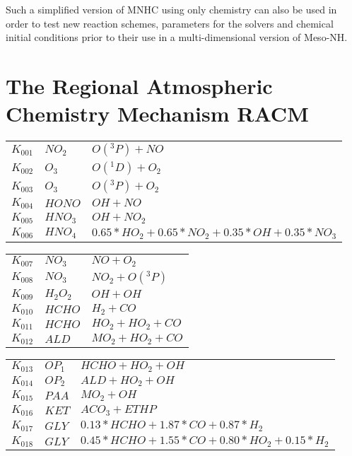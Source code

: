 Such a simplified version of MNHC using only chemistry can also be used
in order to test new reaction schemes, parameters for the solvers and
chemical initial conditions prior to their use in a multi-dimensional
version of Meso-NH.
%
\section*{The Regional Atmospheric Chemistry Mechanism RACM}
\label{RACM}
%
%
{\small
\newlength{\chfwidth}
\setlength{\chfwidth}{1\textwidth}
\noindent
\begin{tabular}{l@{\,:\,}p{0.2\chfwidth}@{$\quad\longrightarrow\quad$}p{0.6\chfwidth}}
$K_{001}$ & $NO_{2}$ & $O({}^3P)+NO$ \\
$K_{002}$ & $O_{3}$ & $O({}^1D)+O_{2}$ \\
$K_{003}$ & $O_{3}$ & $O({}^3P)+O_{2}$ \\
$K_{004}$ & $HONO$ & $OH+NO$ \\
$K_{005}$ & $HNO_{3}$ & $OH+NO_{2}$ \\
$K_{006}$ & $HNO_{4}$ & $0.65*HO_{2}+0.65*NO_{2}+0.35*OH+0.35*NO_{3}$ \\
\end{tabular}

\begin{tabular}{l@{\,:\,}p{0.2\chfwidth}@{$\quad\longrightarrow\quad$}p{0.6\chfwidth}}
$K_{007}$ & $NO_{3}$ & $NO+O_{2}$ \\
$K_{008}$ & $NO_{3}$ & $NO_{2}+O({}^3P)$ \\
$K_{009}$ & $H_{2}O_{2}$ & $OH+OH$ \\
$K_{010}$ & $HCHO$ & $H_{2}+CO$ \\
$K_{011}$ & $HCHO$ & $HO_{2}+HO_{2}+CO$ \\
$K_{012}$ & $ALD$ & $MO_{2}+HO_{2}+CO$ \\
\end{tabular}

\begin{tabular}{l@{\,:\,}p{0.2\chfwidth}@{$\quad\longrightarrow\quad$}p{0.6\chfwidth}}
$K_{013}$ & $OP_{1}$ & $HCHO+HO_{2}+OH$ \\
$K_{014}$ & $OP_{2}$ & $ALD+HO_{2}+OH$ \\
$K_{015}$ & $PAA$ & $MO_{2}+OH$ \\
$K_{016}$ & $KET$ & $ACO_{3}+ETHP$ \\
$K_{017}$ & $GLY$ & $0.13*HCHO+1.87*CO+0.87*H_{2}$ \\
$K_{018}$ & $GLY$ & $0.45*HCHO+1.55*CO+0.80*HO_{2}+0.15*H_{2}$ \\
\end{tabular}

}
